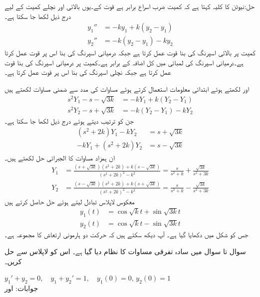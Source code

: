 حل:نیوٹن کا کلیہ کہتا ہے کہ کمیت ضرب اسراع برابر ہے قوت کے۔یوں بالائی اور نچلے کمیت کے لیے درج ذیل لکھا جا سکتا ہے۔
\begin{align*}
y_1''&=-ky_1+k(y_2-y_1)\\
y_2''&=-k(y_2-y_1)-ky_2
\end{align*} 
کمیت  پر بالائی اسپرنگ کی بنا  قوت عمل کرتا ہے جبکہ درمیانی اسپرنگ کی بنا اس پر  قوت عمل کرتا ہے۔درمیانی اسپرنگ کی لمبائی میں کل اضافہ  کے برابر ہے۔کمیت  پر درمیانی اسپرنگ کی بنا  قوت عمل کرتا ہے  جبکہ نچلی اسپرنگ کی بنا اس پر  قوت عمل کرتا ہے۔ 

 اور  لکھتے ہوئے ابتدائی معلومات استعمال کرتے ہوئے مساوات  کی مدد سے  ضمنی مساوات لکھتے ہیں
\begin{align*}
s^2Y_1-s-\sqrt{3k}&=-kY_1+k(Y_2-Y_1)\\
s^2Y_2-s+\sqrt{3k}&=-k(Y_2-Y_1)-kY_2
\end{align*}
جن کو ترتیب دیتے ہوئے درج ذیل لکھا جا سکتا ہے۔
\begin{align*}
(s^2+2k)Y_1-kY_2&=s+\sqrt{3k}\\
-kY_1+(s^2+2k)Y_2&=s-\sqrt{3k}
\end{align*}
ان ہمزاد مساوات کا الجبرائی حل لکھتے ہیں۔
\begin{align*}
Y_1&=\frac{(s+\sqrt{3k})(s^2+2k)+k(s-\sqrt{3k})}{(s^2+2k)^2-k^2}=\frac{s}{s^2+k}+\frac{\sqrt{3k}}{s^2+3k}\\
Y_2&=\frac{(s-\sqrt{3k})(s^2+2k)+k(s+\sqrt{3k})}{(s^2+2k)^2-k^2}=\frac{s}{s^2+k}-\frac{\sqrt{3k}}{s^2+3k}
\end{align*}
معکوس لاپلاس تبادل لیتے ہوئے حل حاصل کرتے ہیں
\begin{align*}
y_1(t)&=\cos \sqrt{k}t+\sin{\sqrt{3k}t}\\
y_2(t)&=\cos \sqrt{k}t-\sin{\sqrt{3k}t}
\end{align*}
جس کو شکل  میں دکھایا گیا ہے۔ آپ دیکھ سکتے ہیں کہ حرکت دو ہارمونی ارتعاش کا مجموعہ ہے۔


سوال  تا سوال  میں سادہ تفرقی مساوات کا نظام دیا گیا ہے۔ اس کو لاپلاس سے حل کریں۔

\quad
$y_1'+y_2=0,\quad y_1+y_2'=1,\quad y_1(0)=0,\, y_2(0)=1$\\
جوابات: اور 

